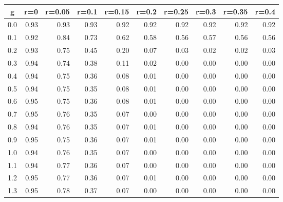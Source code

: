 %
\begin{table}[!tbp]
 \begin{center}
 \begin{tabular}{rrrrrrrrrr}\hline\hline
\multicolumn{1}{c}{g}&\multicolumn{1}{c}{r=0}&\multicolumn{1}{c}{r=0.05}&\multicolumn{1}{c}{r=0.1}&\multicolumn{1}{c}{r=0.15}&\multicolumn{1}{c}{r=0.2}&\multicolumn{1}{c}{r=0.25}&\multicolumn{1}{c}{r=0.3}&\multicolumn{1}{c}{r=0.35}&\multicolumn{1}{c}{r=0.4}\tabularnewline
\hline
0.0&0.93&0.93&0.93&0.92&0.92&0.92&0.92&0.92&0.92\tabularnewline
0.1&0.92&0.84&0.73&0.62&0.58&0.56&0.57&0.56&0.56\tabularnewline
0.2&0.93&0.75&0.45&0.20&0.07&0.03&0.02&0.02&0.03\tabularnewline
0.3&0.94&0.74&0.38&0.11&0.02&0.00&0.00&0.00&0.00\tabularnewline
0.4&0.94&0.75&0.36&0.08&0.01&0.00&0.00&0.00&0.00\tabularnewline
0.5&0.94&0.75&0.35&0.08&0.01&0.00&0.00&0.00&0.00\tabularnewline
0.6&0.95&0.75&0.36&0.08&0.01&0.00&0.00&0.00&0.00\tabularnewline
0.7&0.95&0.76&0.35&0.07&0.00&0.00&0.00&0.00&0.00\tabularnewline
0.8&0.94&0.76&0.35&0.07&0.01&0.00&0.00&0.00&0.00\tabularnewline
0.9&0.95&0.75&0.36&0.07&0.01&0.00&0.00&0.00&0.00\tabularnewline
1.0&0.94&0.76&0.35&0.07&0.00&0.00&0.00&0.00&0.00\tabularnewline
1.1&0.94&0.77&0.36&0.07&0.00&0.00&0.00&0.00&0.00\tabularnewline
1.2&0.95&0.77&0.36&0.07&0.01&0.00&0.00&0.00&0.00\tabularnewline
1.3&0.95&0.78&0.37&0.07&0.00&0.00&0.00&0.00&0.00\tabularnewline
\hline
\end{tabular}

\end{center}

\end{table}

